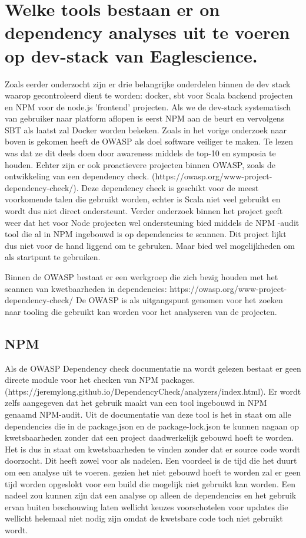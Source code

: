 \section{Welke tools bestaan er on dependency analyses uit te voeren op dev-stack van Eaglescience.}
Zoals eerder onderzocht zijn er drie belangrijke onderdelen binnen de dev stack waarop gecontroleerd dient te worden: docker, sbt voor Scala backend projecten en NPM voor de node.js 'frontend' projecten. Als we de dev-stack systematisch van gebruiker naar platform aflopen is eerst NPM aan de beurt en vervolgens SBT als laatst zal Docker worden bekeken. Zoals in het vorige onderzoek naar boven is gekomen heeft de OWASP als doel software veiliger te maken. Te lezen was dat ze dit deels doen door awareness middels de top-10 en symposia te houden. Echter zijn er ook proactievere projecten binnen OWASP, zoals de ontwikkeling van een dependency check. (https://owasp.org/www-project-dependency-check/). Deze dependency check is geschikt voor de meest voorkomende talen die gebruikt worden, echter is Scala niet veel gebruikt en wordt dus niet direct ondersteunt. Verder onderzoek binnen het project geeft weer dat het voor Node projecten wel ondersteuning bied middels de NPM -audit tool die al in NPM ingebouwd is op dependencies te scannen. Dit project lijkt dus niet voor de hand liggend om te gebruken. Maar bied wel mogelijkheden om als startpunt te gebruiken.

Binnen de OWASP bestaat er een werkgroep die zich bezig houden met het scannen van kwetbaarheden in dependencies: https://owasp.org/www-project-dependency-check/  De OWASP is als uitgangspunt genomen voor het zoeken naar tooling die gebruikt kan worden voor het analyseren van de projecten.


\subsection{NPM}\label{subsec:npm}
Als de OWASP Dependency check documentatie na wordt gelezen bestaat er geen directe module voor het checken van NPM packages. (https://jeremylong.github.io/DependencyCheck/analyzers/index.html). Er wordt zelfs aangegeven dat het gebruik maakt van een tool ingebouwd in NPM genaamd NPM-audit.
Uit de documentatie van deze tool is het in staat om alle dependencies die in de package.json en de package-lock.json te kunnen nagaan op kwetsbaarheden zonder dat een project daadwerkelijk gebouwd hoeft te worden. Het is dus in staat om kwetsbaarheden te vinden zonder dat er source code wordt doorzocht.
Dit heeft zowel voor als nadelen. Een voordeel is de tijd die het duurt om een analyse uit te voeren. gezien het niet gebouwd hoeft te worden zal er geen tijd worden opgeslokt voor een build die mogelijk niet gebruikt kan worden. Een nadeel zou kunnen zijn dat een analyse op alleen de dependencies en het gebruik ervan buiten beschouwing laten wellicht keuzes voorschotelen voor updates die wellicht helemaal niet nodig zijn omdat de kwetsbare code toch niet gebruikt wordt.

